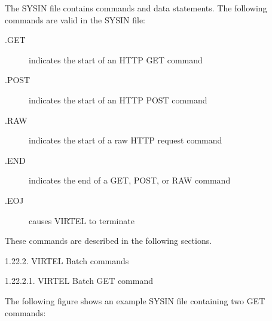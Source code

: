 \documentclass[letterpaper,10pt,english]{sphinxmanual}
\begin{document}

The SYSIN file contains commands and data statements. The following commands are valid in the SYSIN file:
\begin{description}
\item[{.GET}] \leavevmode
indicates the start of an HTTP GET command

\item[{.POST}] \leavevmode
indicates the start of an HTTP POST command

\item[{.RAW}] \leavevmode
indicates the start of a raw HTTP request command

\item[{.END}] \leavevmode
indicates the end of a GET, POST, or RAW command

\item[{.EOJ}] \leavevmode
causes VIRTEL to terminate

\end{description}

These commands are described in the following sections.

1.22.2. VIRTEL Batch commands

1.22.2.1. VIRTEL Batch GET command

The following figure shows an example SYSIN file containing two GET commands:
\end{document}
